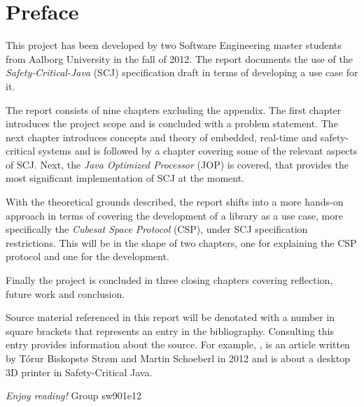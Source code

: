 \newpage
\thispagestyle{empty}
\mbox{}

\chapter*{Preface}
This project has been developed by two Software Engineering master students from Aalborg University in the fall of 2012. The report documents the use of the \textit{Safety-Critical-Java} (SCJ) specification draft in terms of developing a use case for it.

\vspace{4mm}
\noindent The report consists of nine chapters excluding the appendix. The first chapter introduces the project scope and is concluded with a problem statement. The next chapter introduces concepts and theory of embedded, real-time and safety-critical systems and is followed by a chapter covering some of the relevant aspects of SCJ. Next, the \textit{Java Optimized Processor} (JOP) is covered, that provides the most significant implementation of SCJ at the moment.

With the theoretical grounds described, the report shifts into a more hands-on approach in terms of covering the development of a library as a use case, more specifically the \textit{Cubesat Space Protocol} (CSP), under SCJ specification restrictions. This will be in the shape of two chapters, one for explaining the CSP protocol and one for the development.

Finally the project is concluded in three closing chapters covering reflection, future work and conclusion. 

\vspace{4mm}
\noindent Source material referenced in this report will be denotated with a number in square brackets that represents an entry in the bibliography. Consulting this entry provides information about the source. For example, \cite{Schoeberl:2012:RepRap}, is an article written by T\'{o}rur Biskopst{\o} Str{\o}m and Martin Schoeberl in 2012 and is about a desktop 3D printer in Safety-Critical Java.

\vspace{5mm}
	\begin{flushright}
\emph{Enjoy reading!} Group sw901e12
	\end{flushright}

\newpage
